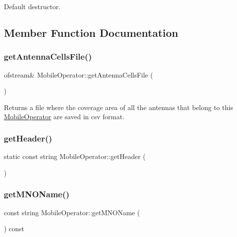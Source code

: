 Default destructor. 

\subsection{Member Function Documentation}
\mbox{\label{class_mobile_operator_ae6aa3043d946fa97eba7032b9707e52a}} 
\subsubsection{\texorpdfstring{get\+Antenna\+Cells\+File()}{getAntennaCellsFile()}}
{\footnotesize\ttfamily ofstream\& Mobile\+Operator\+::get\+Antenna\+Cells\+File (\begin{DoxyParamCaption}{ }\end{DoxyParamCaption})}

\begin{DoxyReturn}{Returns}
a file where the coverage area of all the antennas that belong to this \hyperlink{class_mobile_operator}{Mobile\+Operator} are saved in csv format. 
\end{DoxyReturn}
\mbox{\label{class_mobile_operator_ad440c00732fbab02e41149fffe59a1c8}} 
\subsubsection{\texorpdfstring{get\+Header()}{getHeader()}}
{\footnotesize\ttfamily static const string Mobile\+Operator\+::get\+Header (\begin{DoxyParamCaption}{ }\end{DoxyParamCaption})\hspace{0.3cm}{\ttfamily [static]}}

\mbox{\label{class_mobile_operator_a003a5d91f543eaf5ff11894bd462ac77}} 
\subsubsection{\texorpdfstring{get\+M\+N\+O\+Name()}{getMNOName()}}
{\footnotesize\ttfamily const string Mobile\+Operator\+::get\+M\+N\+O\+Name (\begin{DoxyParamCaption}{ }\end{DoxyParamCaption}) const}

